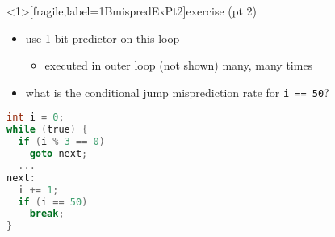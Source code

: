 \begin{frame}<1>[fragile,label=1BmispredExPt2]{exercise (pt 2)}
\begin{itemize}
\item use 1-bit predictor on this loop
    \begin{itemize}
    \item executed in outer loop (not shown) many, many times
    \end{itemize}
\item what is the conditional jump misprediction rate for \verb|i == 50|?
\end{itemize}
\begin{lstlisting}[language=C,style=small]
int i = 0;
while (true) {
  if (i % 3 == 0)
    goto next; 
  ...
next:
  i += 1;
  if (i == 50)
    break; 
}
\end{lstlisting}
\end{frame}

